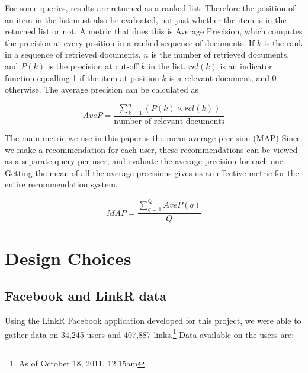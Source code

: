 For some queries, results are returned as a ranked list. Therefore the position of an item in the list must also be evaluated, not just whether the item is in the returned list or not. A metric that does this is Average Precision, which computes the precision at every position in a ranked sequence of documents. If $k$ is the rank in a sequence of retrieved documents, $n$ is the number of retrieved documents, and $P(k)$ is the precision at cut-off $k$ in the list. $rel(k)$ is an indicator function equalling 1 if the item at position $k$ is a relevant document, and 0 otherwise. The average precision can be calculated as

\[
AveP = \frac{\sum_{k=1}^n(P(k) \times rel(k))}{\text{number of relevant documents}}
\]

The main metric we use in this paper is the mean average precision (MAP) Since we make a recommendation for each user, these recommendations can be viewed as a separate query per user, and evaluate the average precision for each one. Getting the mean of all the average precisions gives us an effective metric for the entire recommendation system.

\[
MAP = \frac{\sum_{q=1}^Q AveP(q)}{Q}
\]

\section{Design Choices}

\subsection{Facebook and LinkR data}

Using the LinkR Facebook application developed for this project, we were able to gather data on 34,245 users and 407,887 links.\footnote{As of October 18, 2011, 12:15am}
Data available on the users are:

